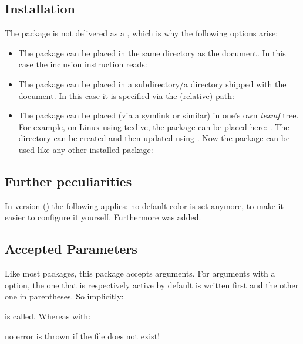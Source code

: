 \documentclass{sopra-base}
\begin{document}
\subsection{Installation}
    The package is not delivered as a , which is why the
    following options arise:
    \begin{itemize}
        \item The package can be placed in the same directory as the
                document. In this case the inclusion instruction reads:
\begin{plainlatex}
\usepackage{sopra-attachments}
\end{plainlatex}
        \item The package can be placed in a subdirectory/a directory
                shipped with the document. In this case it is specified
                via the (relative) path:
\begin{plainlatex}
\usepackage{./My/Path/to/sopra-attachments}
\end{plainlatex}
        \item The package can be placed (via a symlink or similar)
              in one's own \emph{texmf} tree.
              For example, on Linux using texlive,
              the package can be placed here: .
              The directory can be created and then updated using
              . Now
              the package can be used like any other installed package:
\begin{plainlatex}
\usepackage{sopra-attachments}
\end{plainlatex}
    \end{itemize}

\subsection{Further peculiarities}
In version \thesoaversion{} () the following applies: no default color is set anymore, to make it easier to configure it yourself. Furthermore  was added.

\subsection{Accepted Parameters}
    Like most packages, this package accepts arguments.
    For arguments with a  option, the one that is respectively active by default is written first and the other one in parentheses.
    So implicitly:
\begin{plainlatex}
    \usepackage[attsymbols,nodocheck,usefa]{sopra-attachments}
\end{plainlatex}
    is called. Whereas with:
\begin{plainlatex}
    \usepackage[docheck]{sopra-attachments}
\end{plainlatex}
    no error is thrown if the file does not exist!
\end{document}
